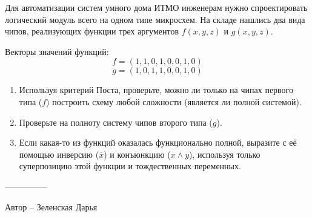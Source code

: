 \question
Для автоматизации систем умного дома ИТМО инженерам нужно спроектировать логический модуль всего на одном типе микросхем. На складе нашлись два вида чипов, реализующих функции трех аргументов $f(x,y,z)$ и $g(x,y,z)$.

Векторы значений функций:
\[ f = (1,1,0,1,0,0,1,0) \]
\[ g = (1,0,1,1,0,0,1,0) \]

\begin{enumerate}
    \item Используя критерий Поста, проверьте, можно ли только на чипах первого типа ($f$) построить схему любой сложности (является ли полной системой).
    \item Проверьте на полноту систему чипов второго типа ($g$).
    \item Если какая-то из функций оказалась функционально полной, выразите с её помощью инверсию ($\overline{x}$) и конъюнкцию ($x \land y$), используя только суперпозицию этой функции и тождественных переменных.
\end{enumerate}

---------------

Автор -- Зеленская Дарья